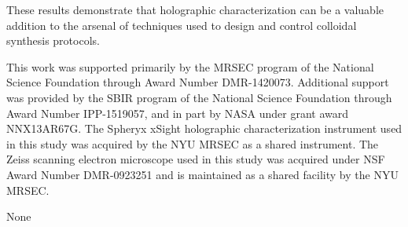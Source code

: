 \documentclass[journal=langd5,manuscript=article,layout=twocolumn]{achemso}
\begin{document}

These results demonstrate that holographic characterization can be a valuable
addition to the arsenal of techniques used to design and control colloidal
synthesis protocols.

\begin{acknowledgement}

This work was supported primarily by the MRSEC program of
the National Science Foundation through Award Number DMR-1420073.
Additional support was provided by the SBIR program of the
National Science Foundation through Award Number IPP-1519057, and in part by
NASA under grant award NNX13AR67G.
The Spheryx xSight holographic characterization instrument
used in this study was acquired by the NYU MRSEC as a shared
instrument.
The Zeiss scanning electron microscope used in this study
was acquired under
NSF Award Number DMR-0923251 and is maintained as a shared
facility by the NYU MRSEC.

\end{acknowledgement}

\begin{suppinfo}

None

\end{suppinfo}


\end{document}
